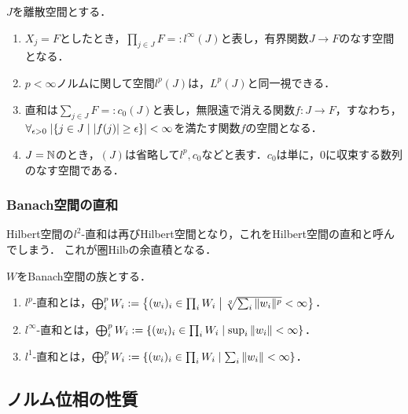 \documentclass[uplatex,dvipdfmx]{jsreport}
\begin{document}
\begin{example}\label{exp-direct-sum-of-norm-spaces}
    $J$を離散空間とする．
    \begin{enumerate}
        \item $X_j=F$としたとき，$\prod_{j\in J}F=:l^\infty(J)$と表し，有界関数$J\to F$のなす空間となる．
        \item $p<\infty$ノルムに関して空間$l^p(J)$は，$L^p(J)$と同一視できる．
        \item 直和は$\sum_{j\in J}F=:c_0(J)$と表し，無限遠で消える関数$f:J\to F$，すなわち，$\forall_{\epsilon>0}\;\lvert\left\{j\in J\mid\lvert f(j)\rvert\ge\epsilon\right\}\rvert<\infty$を満たす関数$f$の空間となる．
        \item $J=\mathbb{N}$のとき，$(J)$は省略して$l^p,c_0$などと表す．$c_0$は単に，$0$に収束する数列のなす空間である．
    \end{enumerate}
\end{example}

\subsubsection{Banach空間の直和}

\begin{tcolorbox}[colframe=ForestGreen, colback=ForestGreen!10!white,breakable,colbacktitle=ForestGreen!40!white,coltitle=black,fonttitle=\bfseries\sffamily,
title=]
    Hilbert空間の$l^2$-直和は再びHilbert空間となり，これをHilbert空間の直和と呼んでしまう．
    これが圏Hilbの余直積となる．
\end{tcolorbox}

\begin{definition}
    $W$をBanach空間の族とする．
    \begin{enumerate}
        \item $l^p$-直和とは，$\bigoplus_{i}^pW_i:=\left\{(w_i)_i\in\prod_{i}W_i\;\middle|\;\sqrt[q]{\sum_i\|w_i\|^p}<\infty\right\}$．
        \item $l^\infty$-直和とは，$\bigoplus_{i}^pW_i:=\left\{(w_i)_i\in\prod_{i}W_i\;\middle|\;\sup_{i}\|w_i\|<\infty\right\}$．
        \item $l^1$-直和とは，$\bigoplus_{i}^pW_i:=\left\{(w_i)_i\in\prod_{i}W_i\;\middle|\;\sum_i\|w_i\|<\infty\right\}$．
    \end{enumerate}
\end{definition}

\subsection{ノルム位相の性質}
\end{document}
